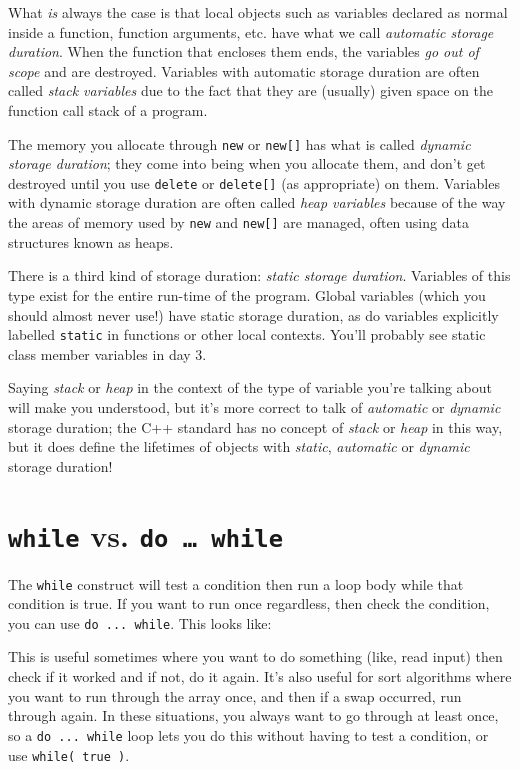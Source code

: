 \documentclass[a4paper]{scrartcl}
\begin{document}
What \emph{is} always the case is that local objects such as variables declared as normal inside a function, function arguments, etc. have what we call \emph{automatic storage duration}. When the function that encloses them ends, the variables \emph{go out of scope} and are destroyed. Variables with automatic storage duration are often called \emph{stack variables} due to the fact that they are (usually) given space on the function call stack of a program.

The memory you allocate through \verb|new| or \verb|new[]| has what is called \emph{dynamic storage duration}; they come into being when you allocate them, and don't get destroyed until you use \verb|delete| or \verb|delete[]| (as appropriate) on them. Variables with dynamic storage duration are often called \emph{heap variables} because of the way the areas of memory used by \verb|new| and \verb|new[]| are managed, often using data structures known as heaps.

There is a third kind of storage duration: \emph{static storage duration}. Variables of this type exist for the entire run-time of the program. Global variables (which you should almost never use!) have static storage duration, as do variables explicitly labelled \verb|static| in functions or other local contexts. You'll probably see static class member variables in day 3.

Saying \emph{stack} or \emph{heap} in the context of the type of variable you're talking about will make you understood, but it's more correct to talk of \emph{automatic} or \emph{dynamic} storage duration; the C++ standard has no concept of \emph{stack} or \emph{heap} in this way, but it does define the lifetimes of objects with \emph{static}, \emph{automatic} or \emph{dynamic} storage duration!

\section{\texttt{while} vs. \texttt{do \ldots\ while}}
The \verb|while| construct will test a condition then run a loop body while that condition is true. If you want to run once regardless, then check the condition, you can use \verb|do ... while|. This looks like:



This is useful sometimes where you want to do something (like, read input) then check if it worked and if not, do it again. It's also useful for sort algorithms where you want to run through the array once, and then if a swap occurred, run through again. In these situations, you always want to go through at least once, so a \verb|do ... while| loop lets you do this without having to test a condition, or use \verb|while( true )|.
\end{document}
